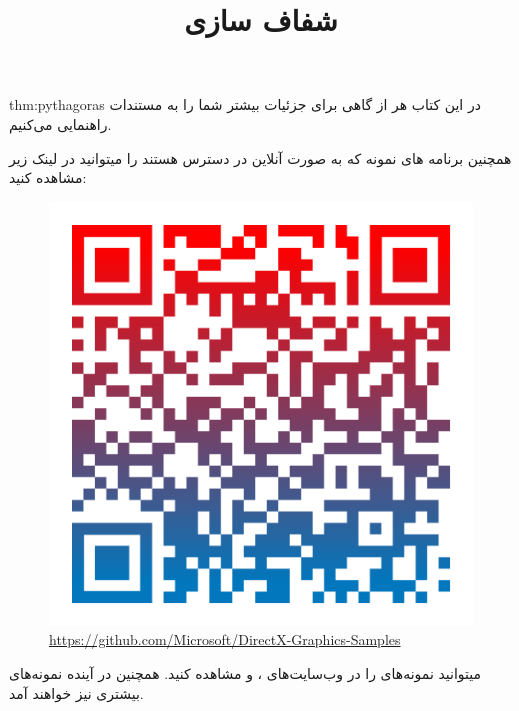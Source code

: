 {\begin{spacing}{1.5}
        \begin{theo}{thm:pythagoras}
            در این کتاب هر از گاهی برای جزئیات بیشتر شما را به مستندات راهنمایی می‌کنیم.
        \end{theo}
        همچنین برنامه های نمونه  که به صورت آنلاین در دسترس هستند را میتوانید در لینک زیر مشاهده کنید:

        \begin{figure}[H]
            \centering
            \setlength{\belowcaptionskip}{-10pt}
            \includegraphics[scale=0.15]{Images/3/3.Intro.1.3}
            \caption*{\Large \url{https://github.com/Microsoft/DirectX-Graphics-Samples}}
        \end{figure}

        میتوانید نمونه‌های  را در وب‌سایت‌های ،  و  مشاهده کنید. همچنین در آینده نمونه‌های بیشتری نیز خواهند آمد.
    \end{spacing}
}
\textbf{\vspace{10pt}}

\title{
    \huge
    \hspace{-40pt}
    \textbf{شفاف سازی}
}  \rullFillWithLine[0.5em]{1pt}
\textbf{\vspace{7pt}}

